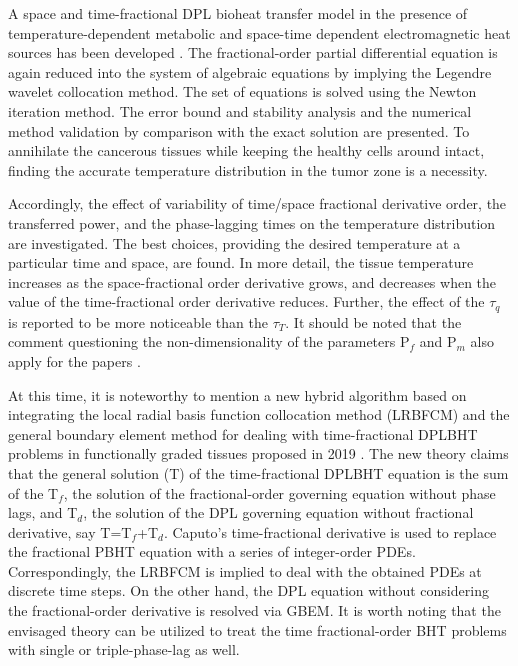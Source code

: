 \documentclass[sn-mathphys]{sn-jnl}%
\theoremstyle{thmstyleone}%
\theoremstyle{thmstyletwo}%
\theoremstyle{thmstylethree}%
\begin{document}
\newline
A space and time-fractional DPL bioheat transfer model in the presence of temperature-dependent metabolic and space-time dependent electromagnetic heat sources has been developed \cite{KNRai2020}. The fractional-order partial differential equation is again reduced into the system of algebraic equations by implying the Legendre wavelet collocation method. The set of equations is solved using the Newton iteration method. The error bound and stability analysis and the numerical method validation by comparison with the exact solution are presented. To annihilate the cancerous tissues while keeping the healthy cells around intact, finding the accurate temperature distribution in the tumor zone is a necessity.

Accordingly, the effect of variability of time/space fractional derivative order, the transferred power, and the phase-lagging times on the temperature distribution are investigated. The best choices, providing the desired temperature at a particular time and space, are found. In more detail, the tissue temperature increases as the space-fractional order derivative grows, and decreases when the value of the time-fractional order derivative reduces. Further, the effect of the $\tau_q$ is reported to be more noticeable than the $\tau_T$. It should be noted that the comment \cite{Pantokratoras2020} questioning the non-dimensionality of the parameters P$_f$ and P$_m$ also apply for the papers \cite{DKumar2017,KNRai2020}.

At this time, it is noteworthy to mention a new hybrid algorithm based on integrating the local radial basis function collocation method (LRBFCM) and the general boundary element method for dealing with time-fractional DPLBHT problems in functionally graded tissues proposed in 2019 \cite{MAFahmy2019}. The new theory claims that the general solution (T) of the time-fractional DPLBHT equation is the sum of the T$_f$, the solution of the fractional-order governing equation without phase lags, and T$_d$, the solution of the DPL governing equation without fractional derivative, say T=T$_f$+T$_d$. Caputo's time-fractional derivative is used to replace the fractional PBHT equation with a series of integer-order PDEs. Correspondingly, the LRBFCM is implied to deal with the obtained PDEs at discrete time steps. On the other hand, the DPL equation without considering the fractional-order derivative is resolved via GBEM. It is worth noting that the envisaged theory can be utilized to treat the time fractional-order BHT problems with single or triple-phase-lag as well.
\end{document}
